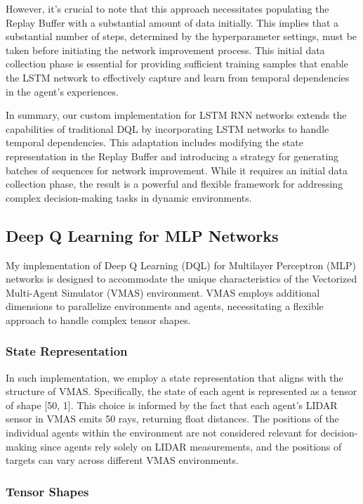 \documentclass{scrartcl}
\begin{document}
However, it's crucial to note that this approach necessitates populating the Replay Buffer with a substantial amount of data initially. This implies that a substantial number of steps, determined by the hyperparameter settings, must be taken before initiating the network improvement process. This initial data collection phase is essential for providing sufficient training samples that enable the LSTM network to effectively capture and learn from temporal dependencies in the agent's experiences.

In summary, our custom implementation for LSTM RNN networks extends the capabilities of traditional DQL by incorporating LSTM networks to handle temporal dependencies. This adaptation includes modifying the state representation in the Replay Buffer and introducing a strategy for generating batches of sequences for network improvement. While it requires an initial data collection phase, the result is a powerful and flexible framework for addressing complex decision-making tasks in dynamic environments.

\subsection{Deep Q Learning for MLP Networks}

My implementation of Deep Q Learning (DQL) for Multilayer Perceptron (MLP) networks is designed to accommodate the unique 
characteristics of the Vectorized Multi-Agent Simulator (VMAS) environment. VMAS employs additional dimensions to parallelize 
environments and agents, necessitating a flexible approach to handle complex tensor shapes.

\subsubsection{State Representation}

In such implementation, we employ a state representation that aligns with the structure of VMAS. Specifically, the state of each agent is represented as a tensor of shape [50, 1]. This choice is informed by the fact that each agent's LIDAR sensor in VMAS emits 50 rays, returning float distances. The positions of the individual agents within the environment are not considered relevant for decision-making since agents rely solely on LIDAR measurements, and the positions of targets can vary across different VMAS environments.

\subsubsection{Tensor Shapes}
\end{document}
